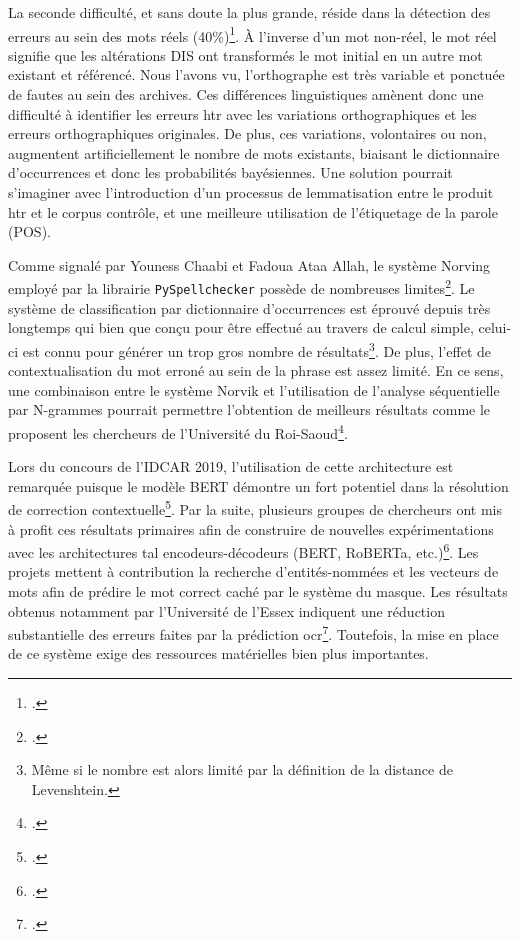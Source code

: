 	La seconde difficulté, et sans doute la plus grande, réside dans la détection des erreurs au sein des mots réels (40\%)\footcite{nguyenDeepStatisticalAnalysis2019}. À l’inverse d'un mot non-réel, le mot réel signifie que les altérations DIS ont transformés le mot initial en un autre mot existant et référencé. Nous l'avons vu, l'orthographe est très variable et ponctuée de fautes au sein des archives. Ces différences linguistiques amènent donc une difficulté à identifier les erreurs \gls{htr} avec les variations orthographiques et les erreurs orthographiques originales. De plus, ces variations, volontaires ou non, augmentent artificiellement le nombre de mots existants, biaisant le dictionnaire d'occurrences et donc les probabilités bayésiennes. Une solution pourrait s'imaginer avec l'introduction d'un processus de lemmatisation entre le produit \gls{htr} et le corpus contrôle, et une meilleure utilisation de l'étiquetage de la parole (POS). \newpar
	
	Comme signalé par Youness Chaabi et Fadoua Ataa Allah, le système Norving employé par la librairie \texttt{PySpellchecker} possède de nombreuses limites\footcite{chaabiAmazighSpellChecker2022}. Le système de classification par dictionnaire d'occurrences est éprouvé depuis très longtemps qui bien que conçu pour être effectué au travers de calcul simple, celui-ci est connu pour générer un trop gros nombre de résultats\footnote{Même si le nombre est alors limité par la définition de la distance de Levenshtein.}. De plus, l'effet de contextualisation du mot erroné au sein de la phrase est assez limité. En ce sens, une combinaison entre le système Norvik et l'utilisation de l'analyse séquentielle par N-grammes pourrait permettre l'obtention de meilleurs résultats comme le proposent les chercheurs de l'Université du Roi-Saoud\footcite{chaabiAmazighSpellChecker2022}.
	
    Lors du concours de l'IDCAR 2019, l'utilisation de cette architecture est remarquée puisque le modèle BERT démontre un fort potentiel dans la résolution de correction contextuelle\footcite{rigaudICDAR2019Competition2019}. Par la suite, plusieurs groupes de chercheurs ont mis à profit ces résultats primaires afin de construire de nouvelles expérimentations avec les architectures \gls{tal} encodeurs-décodeurs (BERT, RoBERTa, etc.)\footcite{palVartaniSpellcheckAutomatic2020, karthikeyanOCRPostCorrectionApproach2022}. Les projets mettent à contribution la recherche d'entités-nommées et les vecteurs de mots afin de prédire le mot correct caché par le système du masque. Les résultats obtenus notamment par l'Université de l'Essex indiquent une réduction substantielle des erreurs faites par la prédiction \gls{ocr}\footcite{karthikeyanOCRPostCorrectionApproach2022}. Toutefois, la mise en place de ce système exige des ressources matérielles bien plus importantes. 